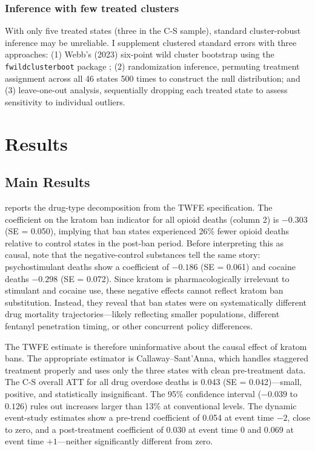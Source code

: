 \documentclass[12pt]{article}
\begin{document}
\subsubsection*{Inference with few treated clusters} With only five treated states (three in the C-S sample), standard cluster-robust inference may be unreliable. I supplement clustered standard errors with three approaches: (1) Webb's (2023) six-point wild cluster bootstrap using the \texttt{fwildclusterboot} package \citep{fischer2021fwildclusterboot}; (2) randomization inference, permuting treatment assignment across all 46 states 500 times to construct the null distribution; and (3) leave-one-out analysis, sequentially dropping each treated state to assess sensitivity to individual outliers.


\section{Results}

\subsection{Main Results}



 reports the drug-type decomposition from the TWFE specification. The coefficient on the kratom ban indicator for all opioid deaths (column 2) is $-0.303$ (SE = 0.050), implying that ban states experienced 26\% fewer opioid deaths relative to control states in the post-ban period. Before interpreting this as causal, note that the negative-control substances tell the same story: psychostimulant deaths show a coefficient of $-0.186$ (SE = 0.061) and cocaine deaths $-0.298$ (SE = 0.072). Since kratom is pharmacologically irrelevant to stimulant and cocaine use, these negative effects cannot reflect kratom ban substitution. Instead, they reveal that ban states were on systematically different drug mortality trajectories---likely reflecting smaller populations, different fentanyl penetration timing, or other concurrent policy differences.

The TWFE estimate is therefore uninformative about the causal effect of kratom bans. The appropriate estimator is Callaway--Sant'Anna, which handles staggered treatment properly and uses only the three states with clean pre-treatment data. The C-S overall ATT for all drug overdose deaths is 0.043 (SE = 0.042)---small, positive, and statistically insignificant. The 95\% confidence interval ($-0.039$ to $0.126$) rules out increases larger than 13\% at conventional levels. The dynamic event-study estimates show a pre-trend coefficient of 0.054 at event time $-2$, close to zero, and a post-treatment coefficient of 0.030 at event time 0 and 0.069 at event time $+1$---neither significantly different from zero.
\end{document}
